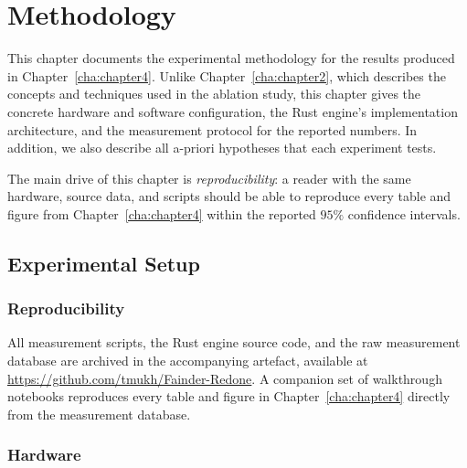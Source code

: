 \chapter{Methodology\label{cha:chapter3}}
This chapter documents the experimental methodology for the results produced in Chapter~\ref{cha:chapter4}. Unlike Chapter~\ref{cha:chapter2}, which describes the concepts and techniques used in the ablation study, this chapter gives the concrete hardware and software configuration, the Rust engine's implementation architecture, and the measurement protocol for the reported numbers. In addition, we also describe all a-priori hypotheses that each experiment tests.

The main drive of this chapter is \emph{reproducibility}: a reader with the same hardware, source data, and scripts should be able to reproduce every table and figure from Chapter~\ref{cha:chapter4} within the reported $95\%$ confidence intervals.

\section{Experimental Setup\label{sec:method:setup}}

\subsection{Reproducibility}

All measurement scripts, the Rust engine source code, and the raw measurement database are archived in the accompanying artefact, available at \url{https://github.com/tmukh/Fainder-Redone}. A companion set of walkthrough notebooks reproduces every table and figure in Chapter~\ref{cha:chapter4} directly from the measurement database.

\subsection{Hardware\label{sec:method:hw}}

